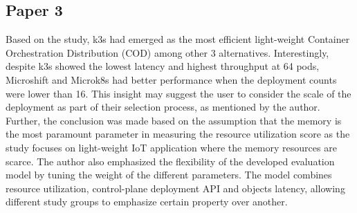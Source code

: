\subsection{Paper 3}%
\label{sub:Paper 3}
Based on the study, k3s had emerged as the most efficient light-weight Container Orchestration Distribution (COD) among other 3 alternatives.
Interestingly, despite k3s showed the lowest latency and highest throughput at 64 pods, Microshift and Microk8s had better performance when the deployment counts were lower than 16.
This insight may suggest the user to consider the scale of the deployment as part of their selection process, as mentioned by the author.
Further, the conclusion was made based on the assumption that the memory is the most paramount parameter in measuring the resource utilization score as the study focuses on light-weight IoT application where the memory resources are scarce.
The author also emphasized the flexibility of the developed evaluation model by tuning the weight of the different parameters.
The model combines resource utilization, control-plane deployment API and objects latency, allowing different study groups to emphasize certain property over another.

